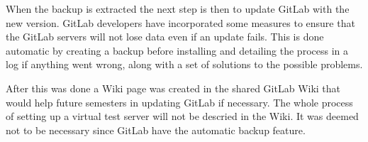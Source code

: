 When the backup is extracted the next step is then to update GitLab with the new version. GitLab developers have incorporated some measures to ensure that the GitLab servers will not lose data even if an update fails. This is done automatic by creating a backup before installing and detailing the process in a log if anything went wrong, along with a set of solutions to the possible problems.

After this was done a Wiki page was created in the shared GitLab Wiki that would help future semesters in updating GitLab if necessary. The whole process of setting up a virtual test server will not be descried in the Wiki. It was deemed not to be necessary since GitLab have the automatic backup feature.
